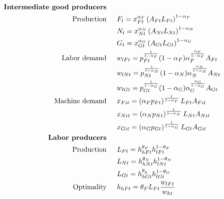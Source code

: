 \begin{align}
\text{\textbf{Intermediate good producers}}\ \hspace{4mm}&\nonumber\\
\text{Production}\ \hspace{4mm}& F_t= x_{Ft}^{\alpha_F}\left(A_{Ft}L_{Ft}\right)^{1-\alpha_F}%
\nonumber\\
&N_t= x_{Nt}^{\alpha_N}\left(A_{Nt}L_{Nt}\right)^{1-\alpha_N}%
\nonumber\\
&G_t=  x_{Gt}^{\alpha_G}\left(A_{Gt}L_{Gt}\right)^{1-\alpha_G} %
\nonumber\\
\text{Labor demand}\ \hspace{4mm}%
& w_{lFt}=p_{Ft}^\frac{1}{1-\alpha_F}(1-\alpha_F)\alpha_F^\frac{\alpha_F}{1-\alpha_F}A_{Ft}\nonumber\\
& w_{lNt}=p_{Nt}^\frac{1}{1-\alpha_N}(1-\alpha_N)\alpha_N^\frac{\alpha_N}{1-\alpha_N}A_{Nt}\nonumber\\
& w_{lGt}=p_{Gt}^\frac{1}{1-\alpha_G}(1-\alpha_G)\alpha_G^\frac{\alpha_G}{1-\alpha_G}A_{Gt}\nonumber
\\
\text{Machine demand}\ \hspace{4mm}
&x_{Fit}= \left(\alpha_F p_{Ft}\right)^\frac{1}{1-\alpha_F}L_{Ft}A_{Fit}\nonumber\\
&x_{Nit}= \left(\alpha_N p_{Nt}\right)^\frac{1}{1-\alpha_N}L_{Nt}A_{Nit}\nonumber\\
&x_{Git}= \left(\alpha_G p_{Gt}\right)^\frac{1}{1-\alpha_G}L_{Gt}A_{Git}\nonumber
\\
\text{\textbf{Labor producers}}\ \hspace{4mm}&\nonumber
\\
\text{Production}\ \hspace{4mm}& L_{Ft}=h_{hFt}^{\theta_{F}}h_{lFt}^{1-\theta_{F}}\nonumber\\
& L_{Nt}=h_{hNt}^{\theta_{N}}h_{lNt}^{1-\theta_{N}}\nonumber\\
& L_{Gt}=h_{hGt}^{\theta_{g}}h_{lGt}^{1-\theta_{G}}\nonumber\\
\text{Optimality}\ \hspace{4mm}& h_{hFt}= \theta_{F}L_{Ft}\frac{w_{lFt}}{w_{ht}}\nonumber\\ %

\end{align}
